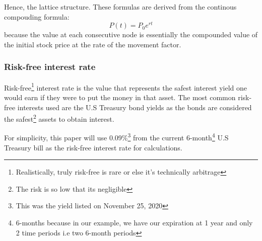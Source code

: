\documentclass[12pt, letterpaper]{article}\usepackage{float}
\begin{document}
\medskip

\noindent Hence, the lattice structure. These formulas are derived from the continous compouding formula\cite{continouscompoundingformulawikipedia, exponentcharacterizationswikipedia}:
\begin{equation*}
  P(t) = {P_0}e^{rt}
\end{equation*}
because the value at each consecutive node is essentially the compounded value of the initial stock price at the rate of the movement factor.


\subsubsection*{Risk-free interest rate}
Risk-free\footnote{Realistically, truly risk-free is rare or else it's technically arbitrage} interest rate is the value that represents the safest interest yield one would earn if they were to put the money in that asset.
The most common risk-free interests used are the U.S Treasury bond yields as the bonds are considered the safest\footnote{The risk is so low that its negligible} assets to obtain interest.

\medskip

For simplicity, this paper will use 0.09\%\footnote{This was the yield listed on November 25, 2020} from the current 6-month\footnote{6-months because in our example, we have our expiration at 1 year and only 2 time periods i.e two 6-month periods} U.S Treasury bill as the risk-free interest rate for calculations.

\pagebreak
\end{document}
